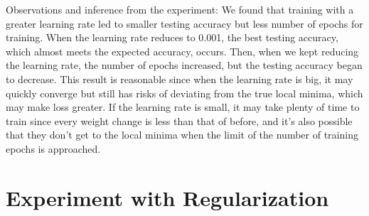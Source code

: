 \documentclass{article}
\begin{document}
    Observations and inference from the experiment:
    We found that training with a greater learning rate led to smaller testing accuracy but less number of epochs for training.
    When the learning rate reduces to 0.001, the best testing accuracy, which almost meets the expected accuracy, occurs.
    Then, when we kept reducing the learning rate, the number of epochs increased, but the testing accuracy began to decrease.
    This result is reasonable since when the learning rate is big, it may quickly converge but still has risks of deviating from the
    true local minima, which may make loss greater.
    If the learning rate is small, it may take plenty of time to train since every weight change is less than that of before, and it's
    also possible that they don't get to the local minima when the limit of the number of training epochs is approached.

    \section{Experiment with Regularization}\label{sec:neural-network-with-regularization}
\end{document}
